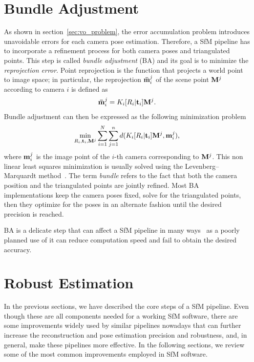 \section{Bundle Adjustment}
As shown in section~\ref{sec:vo_problem}, the error accumulation problem introduces
unavoidable errors for each camera pose estimation. Therefore, a SfM pipeline has to incorporate a 
refinement process for both camera poses and triangulated points.
This step is called \textit{bundle adjustment} (BA) and its goal is to 
minimize the \textit{reprojection error}.
%
Point reprojection is the function that projects a world point to image space; 
in particular, the reprojection ${\mathbf{\bar{m}}_i}^j$ of the scene point 
$\mathbf{M}^j$ according to camera $i$ is defined as
%
\begin{equation*}
	{\mathbf{\bar{m}}_i}^j = K_i[R_i | \mathbf{t}_i]\mathbf{M}^j	\text{.}
\end{equation*}
%
\noindent Bundle adjustment can then be expressed as the following minimization 
problem
\begin{equation*}
	\label{eq:bundle_adj}
	\min_{R_i, \mathbf{t}_i, \mathbf{M}^j} 
	\sum_{i = 1}^N\sum_{j = 1}^n 
	d(K_i[R_i | \mathbf{t}_i]\mathbf{M}^j, \mathbf{m}_i^j) \text{,}
\end{equation*}
%
\noindent where $\mathbf{m}_i^j$ is the image point of the $i$-th camera
corresponding to $\mathbf{M}^j$.
This non linear least squares minimization is usually solved using the 
Levenberg–Marquardt method~\cite{triggs1999bundle,Hartley2004,levenberg1944method}.
The term \textit{bundle} refers to the fact that both the camera position and
the triangulated points are jointly refined. Most BA implementations keep the 
camera poses fixed, solve for the triangulated points, then they optimize for the
poses in an alternate fashion until the desired precision is reached.

BA is a delicate step that can affect a SfM pipeline in many ways~\cite{lourakis2009sba,triggs1999bundle,Hartley2004} as a poorly planned use of 
it can reduce computation speed and fail to obtain the desired accuracy.

\section{Robust Estimation}
In the previous sections, we have described the core steps of a SfM pipeline.
Even though these are all components needed for a working SfM software, 
there are some improvements widely used by similar pipelines nowadays
that can further increase the reconstruction and pose estimation 
precision and robustness, and, in general, make these pipelines more effective.
In the following sections, we review some of the most common improvements 
employed in SfM software.

